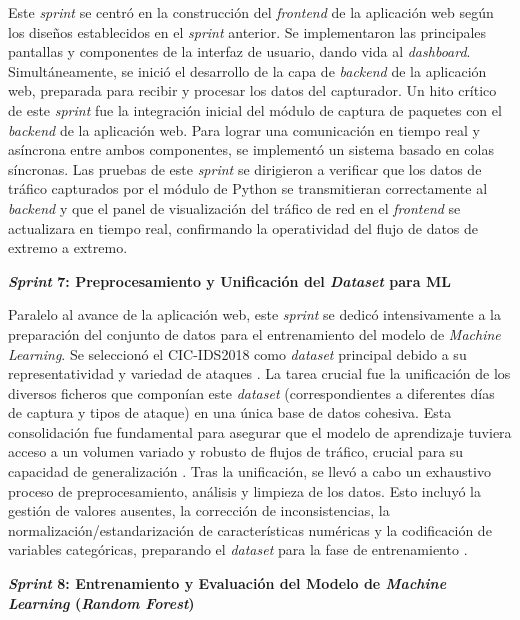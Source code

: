 Este \textit{sprint} se centró en la construcción del \textit{frontend} de la aplicación web según los diseños establecidos en el \textit{sprint} anterior. Se implementaron las principales pantallas y componentes de la interfaz de usuario, dando vida al \textit{dashboard}. Simultáneamente, se inició el desarrollo de la capa de \textit{backend} de la aplicación web, preparada para recibir y procesar los datos del capturador. Un hito crítico de este \textit{sprint} fue la integración inicial del módulo de captura de paquetes con el \textit{backend} de la aplicación web. Para lograr una comunicación en tiempo real y asíncrona entre ambos componentes, se implementó un sistema basado en colas síncronas. Las pruebas de este \textit{sprint} se dirigieron a verificar que los datos de tráfico capturados por el módulo de Python se transmitieran correctamente al \textit{backend} y que el panel de visualización del tráfico de red en el \textit{frontend} se actualizara en tiempo real, confirmando la operatividad del flujo de datos de extremo a extremo.

\textbf{\textit{Sprint} 7: Preprocesamiento y Unificación del \textit{Dataset} para ML}

Paralelo al avance de la aplicación web, este \textit{sprint} se dedicó intensivamente a la preparación del conjunto de datos para el entrenamiento del modelo de \textit{Machine Learning}. Se seleccionó el CIC-IDS2018 como \textit{dataset} principal debido a su representatividad y variedad de ataques \cite{PolaniaArias2021EvaluacionMLIDS}. La tarea crucial fue la unificación de los diversos ficheros que componían este \textit{dataset} (correspondientes a diferentes días de captura y tipos de ataque) en una única base de datos cohesiva. Esta consolidación fue fundamental para asegurar que el modelo de aprendizaje tuviera acceso a un volumen variado y robusto de flujos de tráfico, crucial para su capacidad de generalización \cite{PolaniaArias2021EvaluacionMLIDS}. Tras la unificación, se llevó a cabo un exhaustivo proceso de preprocesamiento, análisis y limpieza de los datos. Esto incluyó la gestión de valores ausentes, la corrección de inconsistencias, la normalización/estandarización de características numéricas y la codificación de variables categóricas, preparando el \textit{dataset} para la fase de entrenamiento \cite{James2013ISLR}.

\textbf{\textit{Sprint} 8: Entrenamiento y Evaluación del Modelo de \textit{Machine Learning} (\textit{Random Forest})}

